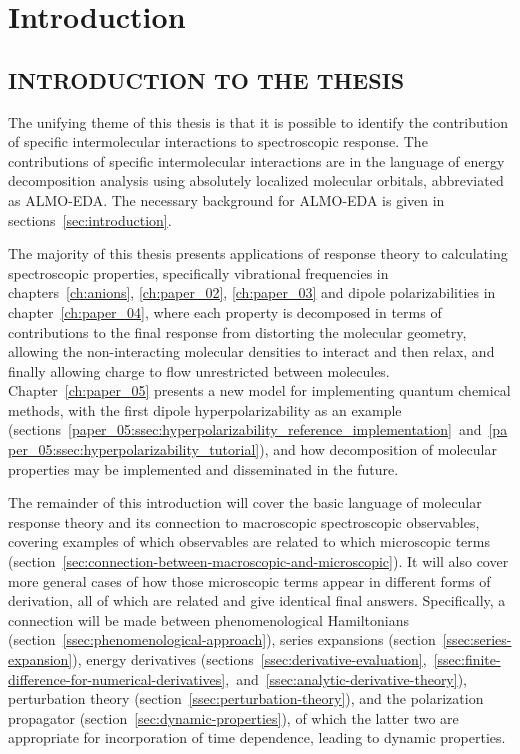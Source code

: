 \documentclass[%
class = book,%
crop = false,%
float = true,%
multi = true,%
preview = false,%
]{standalone}
\newcommand{\caps}[1]{\uppercase{#1}}
\begin{document}
\chapter{Introduction}
\label{ch:introduction}

\section{\texorpdfstring{\caps{Introduction to the thesis}}{Introduction to the thesis}}

The unifying theme of this thesis is that it is possible to identify the contribution of specific intermolecular interactions to spectroscopic response. The contributions of specific intermolecular interactions are in the language of energy decomposition analysis using absolutely localized molecular orbitals, abbreviated as ALMO-EDA. The necessary background for ALMO-EDA is given in sections~\ref{sec:introduction}.

The majority of this thesis presents applications of response theory to calculating spectroscopic properties, specifically vibrational frequencies in chapters~\ref{ch:anions}, \ref{ch:paper_02}, \ref{ch:paper_03} and dipole polarizabilities in chapter~\ref{ch:paper_04}, where each property is decomposed in terms of contributions to the final response from distorting the molecular geometry, allowing the non-interacting molecular densities to interact and then relax, and finally allowing charge to flow unrestricted between molecules. Chapter~\ref{ch:paper_05} presents a new model for implementing quantum chemical methods, with the first dipole hyperpolarizability as an example (sections~\ref{paper_05:ssec:hyperpolarizability_reference_implementation}~and~\ref{paper_05:ssec:hyperpolarizability_tutorial}), and how decomposition of molecular properties may be implemented and disseminated in the future.

The remainder of this introduction will cover the basic language of molecular response theory and its connection to macroscopic spectroscopic observables, covering examples of which observables are related to which microscopic terms (section~\ref{sec:connection-between-macroscopic-and-microscopic}). It will also cover more general cases of how those microscopic terms appear in different forms of derivation, all of which are related and give identical final answers. Specifically, a connection will be made between phenomenological Hamiltonians (section~\ref{ssec:phenomenological-approach}), series expansions (section~\ref{ssec:series-expansion}), energy derivatives (sections~\ref{ssec:derivative-evaluation},~\ref{ssec:finite-difference-for-numerical-derivatives},~and~\ref{ssec:analytic-derivative-theory}), perturbation theory (section~\ref{ssec:perturbation-theory}), and the polarization propagator (section~\ref{sec:dynamic-properties}), of which the latter two are appropriate for incorporation of time dependence, leading to dynamic properties.
\end{document}
